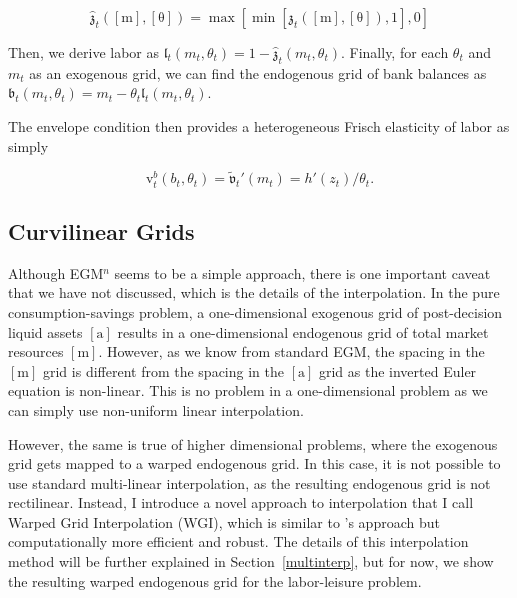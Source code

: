 \documentclass{article}
\newcommand{\tShkEmp}{\theta}
\newcommand{\h}{h}
\newcommand{\bRat}{b}
\newcommand{\leisure}{z}
\newcommand{\vFunc}{\mathrm{v}}
\newcommand{\mRat}{m}
\newcommand{\vOpt}{\tilde{\mathfrak{v}}}
\newcommand{\aMat}{[\mathrm{a}]}
\newcommand{\mMat}{[\mathrm{m}]}
\newcommand{\tShkMat}{[\mathrm{\tShkEmp}]}
\newcommand{\zEndFunc}{\mathfrak{z}}
\newcommand{\lEndFunc}{\mathfrak{l}}
\newcommand{\bEndFunc}{\mathfrak{b}}
\begin{document}
\begin{equation}
\hat{\zEndFunc}_{t}(\mMat, \tShkMat) = \max \left[ \min \left[ \zEndFunc_{t}(\mMat, \tShkMat), 1 \right], 0 \right]
\end{equation}

Then, we derive labor as $\lEndFunc_{t}(\mRat_{t}, \tShkEmp_{t}) = 1 -
  \hat{\zEndFunc}_{t}(\mRat_{t}, \tShkEmp_{t})$. Finally, for each
$\tShkEmp_{t}$ and
$\mRat_{t}$ as an exogenous grid, we can find the endogenous grid of bank
balances as $\bEndFunc_{t}(\mRat_{t}, \tShkEmp_{t}) = \mRat_{t} -
  \tShkEmp_{t}\lEndFunc_{t}(\mRat_{t}, \tShkEmp_{t})$.

The envelope condition then provides a heterogeneous Frisch elasticity of labor as simply

\begin{equation}
\vFunc_{t}^{b}(\bRat_{t}, \tShkEmp_{t}) = \vOpt_{t}'(\mRat_{t}) =
  \h'(\leisure_{t})/\tShkEmp_{t}.
\end{equation}

\subsection{Curvilinear Grids}\label{Curvilinear Grids}

Although EGM$^n$ seems to be a simple approach, there is one important caveat that we have not discussed, which is the details of the interpolation. In the pure consumption-savings problem, a one-dimensional exogenous grid of post-decision liquid assets $\aMat$ results in a one-dimensional endogenous grid of total market resources $\mMat$. However, as we know from standard EGM, the spacing in the $\mMat$ grid is different from the spacing in the $\aMat$ grid as the inverted Euler equation is non-linear. This is no problem in a one-dimensional problem as we can simply use non-uniform linear interpolation.

However, the same is true of higher dimensional problems, where the exogenous grid gets mapped to a warped endogenous grid. In this case, it is not possible to use standard multi-linear interpolation, as the resulting endogenous grid is not rectilinear. Instead, I introduce a novel approach to interpolation that I call Warped Grid Interpolation (WGI), which is similar to \citet{White2015}'s approach but computationally more efficient and robust. The details of this interpolation method will be further explained in Section~\ref{multinterp}, but for now, we show the resulting warped endogenous grid for the labor-leisure problem.
\end{document}
